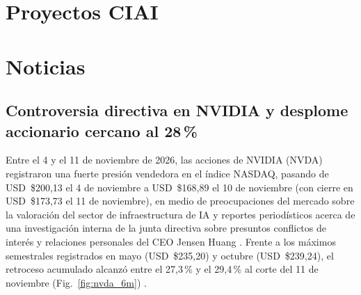 \documentclass[conference,twocolumn,spanish]{IEEEtran}
\begin{document}
\section{Proyectos CIAI}


\section{Noticias}

\subsection{Controversia directiva en NVIDIA y desplome accionario cercano al 28\,\%}
Entre el 4 y el 11 de noviembre de 2026, las acciones de NVIDIA (NVDA) registraron una fuerte presión vendedora en el índice NASDAQ, pasando de USD~\$200,13 el 4 de noviembre a USD~\$168,89 el 10 de noviembre (con cierre en USD~\$173,73 el 11 de noviembre), en medio de preocupaciones del mercado sobre la valoración del sector de infraestructura de IA y reportes periodísticos acerca de una investigación interna de la junta directiva sobre presuntos conflictos de interés y relaciones personales del CEO Jensen Huang \cite{nvda_history_2026, cbc_nvidia_2026}. Frente a los máximos semestrales registrados en mayo (USD~\$235,20) y octubre (USD~\$239,24), el retroceso acumulado alcanzó entre el 27,3\,\% y el 29,4\,\% al corte del 11 de noviembre (Fig.~\ref{fig:nvda_6m}) \cite{nvda_history_2026}.
\end{document}
